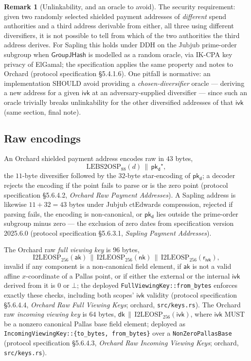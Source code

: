 \documentclass[11pt,a4paper]{article}
\theoremstyle{definition}
\newtheorem{remark}[theorem]{Remark}
\newcommand{\aksym}{\ensuremath{\mathsf{ak}}}
\newcommand{\nksym}{\ensuremath{\mathsf{nk}}}
\newcommand{\ivk}{\ensuremath{\mathsf{ivk}}}
\newcommand{\dk}{\ensuremath{\mathsf{dk}}}
\newcommand{\pkd}{\ensuremath{\mathsf{pk_d}}}
\newcommand{\rivk}{\ensuremath{\mathsf{r_{ivk}}}}
\begin{document}
\begin{remark}[Unlinkability, and an oracle to avoid]\label{rem:unlinkability}
The security requirement: given two randomly selected shielded payment
addresses of \emph{different} spend authorities and a third address
derivable from either, all three using different diversifiers, it is not
possible to tell from which of the two authorities the third address
derives. For Sapling this holds under DDH on the Jubjub prime-order
subgroup when $\mathsf{GroupJHash}$ is modelled as a random oracle, via
IK-CPA key privacy of ElGamal; the specification applies the same property
and notes to Orchard (protocol specification \S5.4.1.6). One pitfall is
normative: an implementation SHOULD avoid providing a
\emph{chosen-diversifier} oracle --- deriving a new address for a given
$\ivk$ at an adversary-supplied diversifier --- since such an oracle
trivially breaks unlinkability for the other diversified addresses of that
$\ivk$ (same section, final note).
\end{remark}

\subsection{Raw encodings}\label{sec:addresses-raw}

An Orchard shielded payment address encodes raw in $43$ bytes,
\[
\mathrm{LEBS2OSP}_{88}(d) \,\|\, \pkd^\star,
\]
the $11$-byte diversifier followed by the $32$-byte star-encoding of
$\pkd$; a decoder rejects the encoding if the point fails to parse or is
the zero point (protocol specification \S5.6.4.2, \emph{Orchard Raw Payment
Addresses}). A Sapling address is likewise $11 + 32 = 43$ bytes under
Jubjub ctEdwards compression, rejected if parsing fails, the encoding is
non-canonical, or $\pkd$ lies outside the prime-order subgroup minus zero
--- the exclusion of zero dates from specification version 2025.6.0
(protocol specification \S5.6.3.1, \emph{Sapling Payment Addresses}).

The Orchard raw \emph{full viewing key} is $96$ bytes,
\[
\mathrm{I2LEOSP}_{256}(\aksym) \,\|\, \mathrm{I2LEOSP}_{256}(\nksym)
\,\|\, \mathrm{I2LEOSP}_{256}(\rivk),
\]
invalid if any component is a non-canonical field element, if $\aksym$ is
not a valid affine $x$-coordinate of a Pallas point, or if either the
external or the internal $\ivk$ derived from it is $0$ or $\bot$; the
deployed \texttt{FullViewingKey::from\_bytes} enforces exactly these
checks, including both scopes' $\ivk$ validity (protocol specification
\S5.6.4.4, \emph{Orchard Raw Full Viewing Keys}; \textsf{orchard},
\texttt{src/keys.rs}). The Orchard raw \emph{incoming viewing key} is $64$
bytes, $\dk \,\|\, \mathrm{I2LEOSP}_{256}(\ivk)$, where $\ivk$ MUST be a
nonzero canonical Pallas base field element; deployed as
\texttt{IncomingViewingKey::\{to\_bytes, from\_bytes\}} over a
\texttt{NonZeroPallasBase} (protocol specification \S5.6.4.3,
\emph{Orchard Raw Incoming Viewing Keys}; \textsf{orchard},
\texttt{src/keys.rs}).
\end{document}
